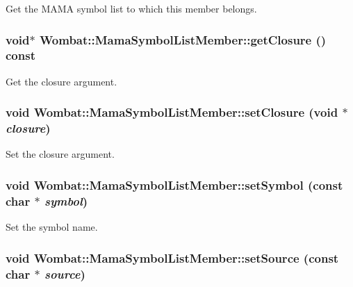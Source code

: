 Get the MAMA symbol list to which this member belongs. \hypertarget{classWombat_1_1MamaSymbolListMember_aa98bb1713122db2e76f76925d67c292e}{
\subsubsection[{getClosure}]{\setlength{\rightskip}{0pt plus 5cm}void$\ast$ Wombat::MamaSymbolListMember::getClosure () const}}
\label{classWombat_1_1MamaSymbolListMember_aa98bb1713122db2e76f76925d67c292e}


Get the closure argument. \hypertarget{classWombat_1_1MamaSymbolListMember_aa56da8d3fa7b9531cc8fb059ba83f396}{
\subsubsection[{setClosure}]{\setlength{\rightskip}{0pt plus 5cm}void Wombat::MamaSymbolListMember::setClosure (void $\ast$ {\em closure})}}
\label{classWombat_1_1MamaSymbolListMember_aa56da8d3fa7b9531cc8fb059ba83f396}


Set the closure argument. \hypertarget{classWombat_1_1MamaSymbolListMember_af8dd71310a64a7ff37ac936d0300d7e0}{
\subsubsection[{setSymbol}]{\setlength{\rightskip}{0pt plus 5cm}void Wombat::MamaSymbolListMember::setSymbol (const char $\ast$ {\em symbol})}}
\label{classWombat_1_1MamaSymbolListMember_af8dd71310a64a7ff37ac936d0300d7e0}


Set the symbol name. \hypertarget{classWombat_1_1MamaSymbolListMember_ade8e521c44ea064df4acf3868bcd0cb1}{
\subsubsection[{setSource}]{\setlength{\rightskip}{0pt plus 5cm}void Wombat::MamaSymbolListMember::setSource (const char $\ast$ {\em source})}}
\label{classWombat_1_1MamaSymbolListMember_ade8e521c44ea064df4acf3868bcd0cb1}



